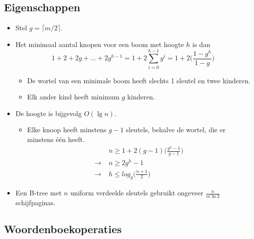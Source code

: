 \subsection{Eigenschappen}
\begin{itemize}
    \item Stel $g = \lceil m/2 \rceil$.
    \item Het minimaal aantal knopen voor een boom met hoogte $h$ is dan
    $$1 + 2 + 2g + \dots + 2g^{h - 1} = 1 + 2\sum_{i=0}^{h - 1}g^i = 1 + 2\bigg(\frac{1-g^h}{1-g}\bigg) $$
    \begin{itemize}
        \item De wortel van een minimale boom heeft slechts 1 sleutel en twee kinderen.
        \item Elk ander kind heeft minimum $g$ kinderen.
    \end{itemize}
    \item De hoogte is bijgevolg $O(\lg n)$.
    \begin{itemize}
        \item Elke knoop heeft minstens $g - 1$ sleutels, behalve de wortel, die er minstens één heeft.
        \begin{align*}
            & n \geq 1 + 2(g - 1)\bigg(\frac{g^h - 1}{g - 1} \bigg) \\
            \rightarrow \;& n \geq 2g^h - 1 \\
            \rightarrow \;& h \leq log_g\bigg(\frac{n+1}{2}\bigg)
        \end{align*}
    \end{itemize}
    \item Een B-tree met $n$ uniform verdeelde sleutels gebruikt ongeveer $\frac{n}{m\ln 2}$ schijfpaginas. 
\end{itemize}

\subsection{Woordenboekoperaties}

